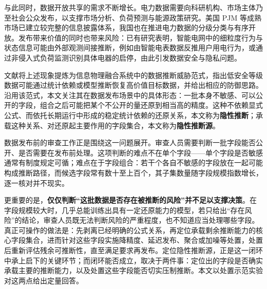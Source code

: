 \documentclass[UTF8,zihao=5,twoside]{ctexart}
\begin{document}
与此同时，数据开放共享的需求不断增长。电力数据需要向科研机构、市场主体乃至社会公众发布，以支撑市场分析、负荷预测与能源政策研究\cite{ref-zhu-sharing}。美国 PJM 等成熟市场已建立较完整的信息披露体系\cite{ref-ma-pjm,ref-pjm-dataminer}，我国也在推进电力数据的分级分类与有序开放。发布带来价值的同时也带来风险：已有研究表明，智能电网中的细粒度行为与状态信息可能由外部观测间接推断，例如由智能电表数据反推用户用电行为\cite{ref-sankar,ref-giaconi}，或通过非侵入式负荷监测识别具体电器的启停\cite{ref-chen-privacy}，由此引发数据安全与隐私问题\cite{ref-adewole,ref-zhang-sgcc}。

文献\cite{ref-liu-data-inference}将上述现象提炼为信息物理融合系统中的数据推断威胁范式，指出低安全等级数据可能通过统计依赖或模型推断恢复高价值目标数据，并给出相应的防御思路。沿用该范式，本文关注其在数据发布场景中的具体形态：一批本身不敏感、可以公开的字段，组合之后可能把某个不公开的量还原到相当高的精度。这种不依赖显式公式、而依托长期运行中形成的稳定统计依赖的还原关系，本文称为\textbf{隐性推断}；承载这种关系、对还原起主要作用的字段集合，本文称为\textbf{隐性推断源}。

数据发布前的审查工作正是围绕这一问题展开。审查人员需要判断一批字段能否公开、是否需要在发布前处理。这项判断的难点不在单个字段——单个字段是否敏感通常有制度规定可循；难点在于字段组合：若干个各自不敏感的字段放在一起可能构成推断路径，而候选字段常有数十至上百个，其子集数量随字段规模指数增长，逐一核对并不现实。

更重要的是，\textbf{仅仅判断“这批数据是否存在被推断的风险”并不足以支撑决策}。在字段规模较大时，几乎总能训练出具有一定还原能力的模型，若只给出“存在风险”的结论，审查人员既无法判断风险的严重程度，也不知道应当处理哪些字段。真正可操作的做法是：先剥离已经明确的公式关系，再定位承载剩余推断能力的核心字段集合，进而针对这些字段实施降精度、延迟发布、聚合或加噪等处置，处置后重新评估残余可推断性，直至满足要求再发布。定位隐性推断源，正是这一闭环中承上启下的关键环节；而闭环能否成立，取决于两件事：定位出的字段是否确实承载主要的推断能力，以及处置这些字段能否切实压制推断。本文以处置示范实验对这两点给出定量回答。
\end{document}
